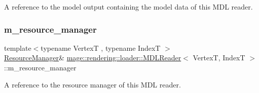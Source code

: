 A reference to the model output containing the model data of this M\+DL reader. \hypertarget{classmage_1_1rendering_1_1loader_1_1_m_d_l_reader_ae1a276e89104344daa25666e4b074643}{}\label{classmage_1_1rendering_1_1loader_1_1_m_d_l_reader_ae1a276e89104344daa25666e4b074643} 
\subsubsection{\texorpdfstring{m\+\_\+resource\+\_\+manager}{m\_resource\_manager}}
{\footnotesize\ttfamily template$<$typename VertexT , typename IndexT $>$ \\
\hyperlink{classmage_1_1rendering_1_1_resource_manager}{Resource\+Manager}\& \hyperlink{classmage_1_1rendering_1_1loader_1_1_m_d_l_reader}{mage\+::rendering\+::loader\+::\+M\+D\+L\+Reader}$<$ VertexT, IndexT $>$\+::m\+\_\+resource\+\_\+manager\hspace{0.3cm}{\ttfamily [private]}}

A reference to the resource manager of this M\+DL reader. 